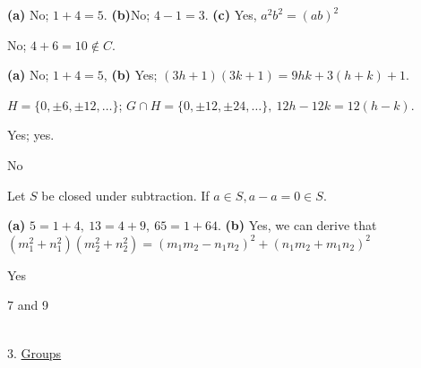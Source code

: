 \documentclass[12pt]{book}
\theoremstyle{definition}
\begin{document}
\begin{oddenumerate}
	\item \textbf{(a)} No; $ 1+4=5 $.  \textbf{(b)}No; $4-1=3.  $  \textbf{(c)} Yes, $ a^2b^2=(ab)^2 $
	
	\item  No; $ 4+6=10 \notin C $.
	
	\item  \textbf{(a)} No; $ 1+4=5 $,  \textbf{(b)} Yes; $ (3h+1)(3k+1)=9hk+3(h+k)+1. $
	
	\item $ H=\{0,\pm6,\pm12,\dots\} $; $ G\cap H=\{0,\pm12,\pm24,\dots\}, ~ 12h-12k=12(h-k). $
	
	\item Yes; yes.
	
	\item No
	
	\item Let $ S $ be closed under subtraction. If $ a\in S, a-a=0 \in S. $
	
	\item  \textbf{(a)} $ 5=1+4,~ 13=4+9, ~ 65=1+64 $. {\textbf{(b)} Yes, we can derive that \\$ (m_1^2+n_1^2)(m_2^2+n_2^2)= (m_1m_2-n_1n_2)^2+(n_1m_2+m_1n_2)^2$} 
	
	\item Yes
	
	\item 7 and 9
	
	
\end{oddenumerate}

~\\[.1in]
{\Large 3. \underline{Groups}}
\end{document}
